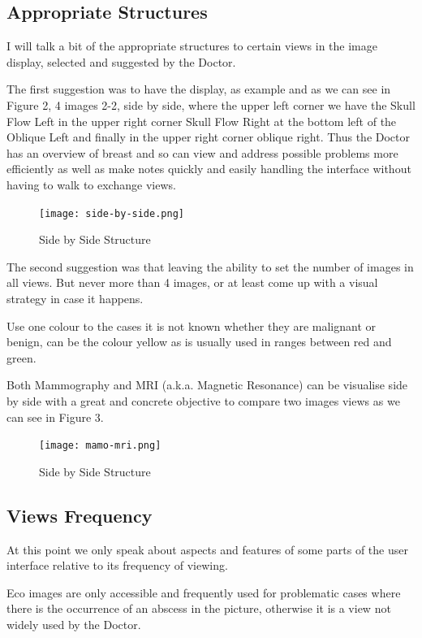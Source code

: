 \subsection{Appropriate Structures}

I will talk a bit of the appropriate structures to certain views in the image display, selected and suggested by the Doctor.

The first suggestion was to have the display, as example and as we can see in Figure 2, 4 images 2-2, side by side, where the upper left corner we have the Skull Flow Left in the upper right corner Skull Flow Right at the bottom left of the Oblique Left and finally in the upper right corner oblique right. Thus the Doctor has an overview of breast and so can view and address possible problems more efficiently as well as make notes quickly and easily handling the interface without having to walk to exchange views.

\begin{figure}[!hbt]
\centering
\texttt{[image: side-by-side.png]}
\caption{\label{fig:frog}Side by Side Structure}
\end{figure}

The second suggestion was that leaving the ability to set the number of images in all views. But never more than 4 images, or at least come up with a visual strategy in case it happens.

Use one colour to the cases it is not known whether they are malignant or benign, can be the colour yellow as is usually used in ranges between red and green.

Both Mammography and MRI (a.k.a. Magnetic Resonance) can be visualise side by side with a great and concrete objective to compare two images views as we can see in Figure 3.

\begin{figure}[!hbt]
\centering
\texttt{[image: mamo-mri.png]}
\caption{\label{fig:frog}Side by Side Structure}
\end{figure}

\subsection{Views Frequency}

At this point we only speak about aspects and features of some parts of the user interface relative to its frequency of viewing.

Eco images are only accessible and frequently used for problematic cases where there is the occurrence of an abscess in the picture, otherwise it is a view not widely used by the Doctor.

